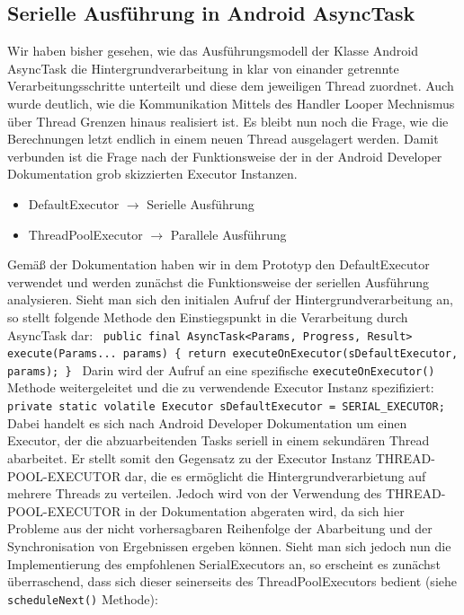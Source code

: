 \documentclass[12pt,oneside,a4paper,bibtotoc,liststotoc]{scrreprt}
\begin{document}
\subsection{Serielle Ausführung in Android AsyncTask}
Wir haben bisher gesehen, wie das Ausführungsmodell der Klasse Android AsyncTask die Hintergrundverarbeitung in klar von einander getrennte Verarbeitungsschritte unterteilt und diese dem jeweiligen Thread zuordnet. Auch wurde deutlich, wie die Kommunikation Mittels des Handler Looper Mechnismus über Thread Grenzen hinaus realisiert ist. Es bleibt nun noch die Frage, wie die Berechnungen letzt endlich in einem neuen Thread ausgelagert werden. Damit verbunden ist die Frage nach der Funktionsweise der in der Android Developer Dokumentation grob skizzierten Executor Instanzen.
\begin{itemize}
\item DefaultExecutor $\rightarrow$ Serielle Ausführung
\item ThreadPoolExecutor $\rightarrow$ Parallele Ausführung
\end{itemize}
Gemäß der Dokumentation haben wir in dem Prototyp den DefaultExecutor verwendet und werden zunächst die Funktionsweise der seriellen Ausführung analysieren. Sieht man sich den initialen Aufruf der Hintergrundverarbeitung an, so stellt folgende Methode den Einstiegspunkt in die Verarbeitung durch AsyncTask dar:\newline
\texttt{\newline
public final AsyncTask<Params, Progress, Result> execute(Params... params) \{\newline
    return executeOnExecutor(sDefaultExecutor, params);\newline
\}\newline
}\newline
Darin wird der Aufruf an eine spezifische \texttt{executeOnExecutor()} Methode weitergeleitet und die zu verwendende Executor Instanz spezifiziert:\newline
\texttt{\newline
private static volatile Executor sDefaultExecutor = SERIAL\_EXECUTOR;\newline
}\newline
Dabei handelt es sich nach Android Developer Dokumentation um einen Executor, der die abzuarbeitenden Tasks seriell in einem sekundären Thread abarbeitet. Er stellt somit den Gegensatz zu der Executor Instanz THREAD-POOL-EXECUTOR dar, die es ermöglicht die Hintergrundverarbietung auf mehrere Threads zu verteilen. Jedoch wird von der Verwendung des THREAD-POOL-EXECUTOR in der Dokumentation abgeraten wird, da sich hier Probleme aus der nicht vorhersagbaren Reihenfolge der Abarbeitung und der Synchronisation von Ergebnissen ergeben können. Sieht man sich jedoch nun die Implementierung des empfohlenen SerialExecutors an, so erscheint es zunächst überraschend, dass sich dieser seinerseits des ThreadPoolExecutors bedient (siehe \texttt{scheduleNext()} Methode):\newline
\end{document}
